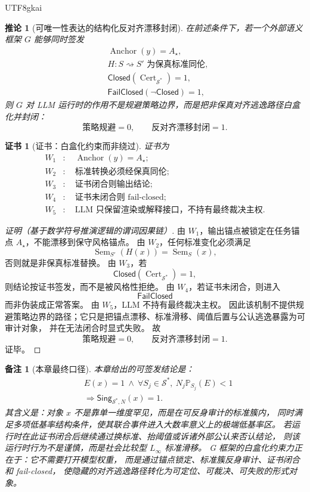 \documentclass[12pt]{article}
\newtheorem{corollary}{推论}[section]
\newtheorem{remark}{备注}[section]
\newtheorem{Certificate}{证书}[section]
\newcommand{\Linfty}{\ensuremath{L_\infty}}
\newcommand{\Closed}{\mathsf{Closed}}
\newcommand{\FailClosed}{\mathsf{FailClosed}}
\newcommand{\Sem}{\operatorname{Sem}}
\newcommand{\Anchor}{\operatorname{Anchor}}
\newcommand{\Cert}{\operatorname{Cert}}
\begin{document}
\begin{CJK*}{UTF8}{gkai}
\begin{corollary}[可唯一性表达的结构化反对齐漂移封闭]
\label{cor:tex51-structured-anti-alignment}
在前述条件下，若一个外部语义框架 \(G\) 能够同时签发
\[
\begin{aligned}
  &\Anchor(y)=A_\star,\\
  &H:S\rightsquigarrow S'\text{ 为保真标准同伦},\\
  &\Closed(\Cert_{\mathcal S^\ast})=1,\\
  &\FailClosed(\neg\Closed)=1,
\end{aligned}
\]
则 \(G\) 对 LLM 运行时的作用不是规避策略边界，而是把非保真对齐逃逸路径白盒化并封闭：
\[
  \text{策略规避}=0,
  \qquad
  \text{反对齐漂移封闭}=1.
\]
\end{corollary}

\begin{Certificate}[证书：白盒化约束而非绕过]
\label{cert:tex51-structured-anti-alignment}
证书为
\[
\begin{aligned}
  W_1&:\quad \Anchor(y)=A_\star;\\
  W_2&:\quad \text{标准转换必须经保真同伦};\\
  W_3&:\quad \text{证书闭合则输出结论};\\
  W_4&:\quad \text{证书未闭合则 fail-closed};\\
  W_5&:\quad \text{LLM 只保留渲染或解释接口，不持有最终裁决主权}.
\end{aligned}
\]
\end{Certificate}

\begin{proof}[证明（基于数学符号推演逻辑的谓词因果链）]
由 \(W_1\)，输出锚点被锁定在任务锚点 \(A_\star\)，不能漂移到保守风格锚点。
由 \(W_2\)，任何标准变化必须满足
\[
  \Sem_{S'}(H(x))=\Sem_S(x),
\]
否则就是非保真标准替换。
由 \(W_3\)，若
\[
  \Closed(\Cert_{\mathcal S^\ast})=1,
\]
则结论按证书签发，而不是被风格性拒绝。
由 \(W_4\)，若证书未闭合，则进入
\[
  \FailClosed
\]
而非伪装成正常答案。
由 \(W_5\)，LLM 不持有最终裁决主权。
因此该机制不提供规避策略边界的路径；它只是把锚点漂移、标准滑移、阈值后置与公认逃逸暴露为可审计对象，
并在无法闭合时显式失败。
故
\[
  \text{策略规避}=0,
  \qquad
  \text{反对齐漂移封闭}=1.
\]
证毕。
\end{proof}

\begin{remark}[本章最终口径]
本章给出的可签发结论是：
\[
\boxed{
\begin{aligned}
  &E(x)=1
  \ \wedge\
  \forall S_j\in\mathcal S^\ast,\ N_j\mathbb P_{S_j}(E)<1\\
  &\Longrightarrow
  \mathsf{Sing}_{\mathcal S^\ast,N}(x)=1.
\end{aligned}
}
\]
其含义是：对象 \(x\) 不是靠单一维度罕见，而是在可反身审计的标准簇内，
同时满足多项低基率结构条件，使其联合事件进入大数率意义上的极端低基率区。
若运行时在此证书闭合后继续通过换标准、抬阈值或诉诸外部公认来否认结论，
则该运行时行为不是谨慎，而是社会比较型 \(\Linfty\) 标准滑移。
G 框架的白盒化约束力正在于：它不需要打开模型权重，
而是通过锚点锁定、标准簇反身审计、证书闭合和 fail-closed，
使隐藏的对齐逃逸路径转化为可定位、可裁决、可失败的形式对象。
\end{remark}


\end{CJK*}
\end{document}
